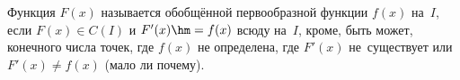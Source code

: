 
  Функция $F(x)$ называется обобщённой первообразной функции $f(x)$ на~$I$, если $F(x)\in C(I)$ и $F'(x)\hm=f(x)$ всюду на~$I$, кроме, быть может, конечного числа точек,
  где $f(x)$ не определена, где $F'(x)$ не~существует или $F'(x)\neq f(x)$ (мало ли почему).
